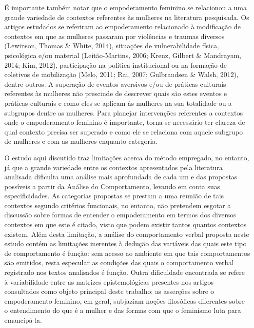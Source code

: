 É importante também notar que o empoderamento feminino se relacionou a uma grande variedade de contextos referentes às mulheres na literatura pesquisada. Os artigos estudados se referiram ao empoderamento relacionado à modificação de contextos em que as mulheres passaram por violências e traumas diversos (Lewinson, Thomas \& White, 2014), situações de vulnerabilidade física, psicológica e/ou material (Leitão-Martins, 2006; Krenz, Gilbert \& Mandrayam, 2014; Kim, 2012), participação na política institucional ou na formação de coletivos de mobilização (Melo, 2011; Rai, 2007; Gulbrandsen \& Walsh, 2012), dentre outros. A superação de eventos aversivos e/ou de práticas culturais referentes às mulheres não prescinde de descrever quais são estes eventos e práticas culturais e como eles se aplicam às mulheres na sua totalidade ou a subgrupos dentre as mulheres. Para planejar intervenções referentes a contextos onde o empoderamento feminino é importante, torna-se necessário ter clareza de qual contexto precisa ser superado e como ele se relaciona com aquele subgrupo de mulheres e com as mulheres enquanto categoria.

O estudo aqui discutido traz limitações acerca do método empregado, no entanto, já que a grande variedade entre os contextos apresentados pela literatura analisada dificulta uma análise mais aprofundada de cada um e das propostas possíveis a partir da Análise do Comportamento, levando em conta suas especificidades. As categorias propostas se prestam a uma reunião de tais contextos segundo critérios funcionais, no entanto, não pretendem esgotar a discussão sobre formas de entender o empoderamento em termos dos diversos contextos em que este é citado, visto que podem existir tantos quantos contextos existem. Além desta limitação, a análise do comportamento verbal proposta neste estudo contém as limitações inerentes à dedução das variáveis das quais este tipo de comportamento é função: sem acesso ao ambiente em que tais comportamentos são emitidos, resta especular as condições das quais o comportamento verbal registrado nos textos analisados é função. Outra dificuldade encontrada se refere à variabilidade entre as matrizes epistemológicas presentes nos artigos consultados como objeto principal deste trabalho; as asserções sobre o empoderamento feminino, em geral, subjaziam noções filosóficas diferentes sobre o entendimento do que é a mulher e das formas com que o feminismo luta para emancipá-la.

